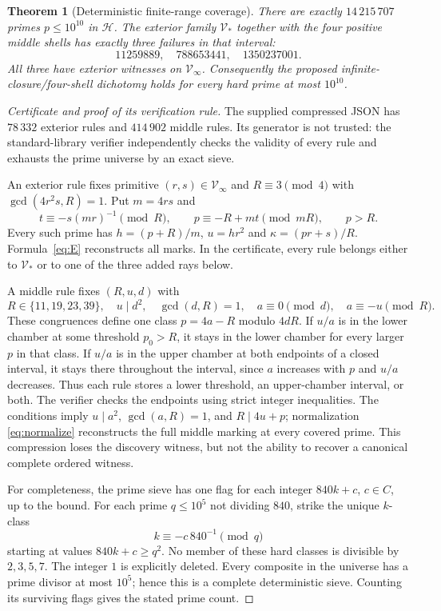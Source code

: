 \documentclass[11pt]{article}
\newtheorem{theorem}{Theorem}[section]
\theoremstyle{definition}\newtheorem{definition}[theorem]{Definition}
\theoremstyle{remark}\newtheorem{remark}[theorem]{Remark}
\newcommand{\HH}{\mathcal H}
\newcommand{\V}{\mathcal V}
\begin{document}
\begin{theorem}[Deterministic finite-range coverage]\label{thm:range}
There are exactly $14\,215\,707$ primes $p\le10^{10}$ in $\HH$. The exterior family $\V_*$ together with the four positive middle shells has exactly three failures in that interval:
\[
 11259889,\quad788653441,\quad1350237001.
\]
All three have exterior witnesses on $\V_\infty$. Consequently the proposed infinite-closure/four-shell dichotomy holds for every hard prime at most $10^{10}$.
\end{theorem}
\begin{proof}[Certificate and proof of its verification rule]
The supplied compressed JSON has $78\,332$ exterior rules and $414\,902$ middle rules. Its generator is not trusted: the standard-library verifier independently checks the validity of every rule and exhausts the prime universe by an exact sieve.

An exterior rule fixes primitive $(r,s)\in\V_\infty$ and $R\equiv3\pmod4$ with $\gcd(4r^2s,R)=1$. Put $m=4rs$ and
\begin{equation}\label{eq:Erule}
 t\equiv-s(mr)^{-1}\pmod R,\qquad
 p\equiv-R+mt\pmod{mR},\qquad p>R.
\end{equation}
Every such prime has $h=(p+R)/m$, $u=hr^2$ and $\kappa=(pr+s)/R$. Formula~\eqref{eq:E} reconstructs all marks. In the certificate, every rule belongs either to $\V_*$ or to one of the three added rays below.

A middle rule fixes $(R,u,d)$ with
\begin{equation}\label{eq:Mrule}
 R\in\{11,19,23,39\},\quad u\mid d^2,\quad\gcd(d,R)=1,
 \quad a\equiv0\pmod d,\quad a\equiv-u\pmod R.
\end{equation}
These congruences define one class $p=4a-R$ modulo $4dR$. If $u/a$ is in the lower chamber at some threshold $p_0>R$, it stays in the lower chamber for every larger $p$ in that class. If $u/a$ is in the upper chamber at both endpoints of a closed interval, it stays there throughout the interval, since $a$ increases with $p$ and $u/a$ decreases. Thus each rule stores a lower threshold, an upper-chamber interval, or both. The verifier checks the endpoints using strict integer inequalities. The conditions imply $u\mid a^2$, $\gcd(a,R)=1$, and $R\mid4u+p$; normalization \eqref{eq:normalize} reconstructs the full middle marking at every covered prime. This compression loses the discovery witness, but not the ability to recover a canonical complete ordered witness.

For completeness, the prime sieve has one flag for each integer $840k+c$, $c\in C$, up to the bound. For each prime $q\le10^5$ not dividing $840$, strike the unique $k$-class
\[
 k\equiv-c\,840^{-1}\pmod q
\]
starting at values $840k+c\ge q^2$. No member of these hard classes is divisible by $2,3,5,7$. The integer $1$ is explicitly deleted. Every composite in the universe has a prime divisor at most $10^5$; hence this is a complete deterministic sieve. Counting its surviving flags gives the stated prime count.


\end{proof}
\end{document}
